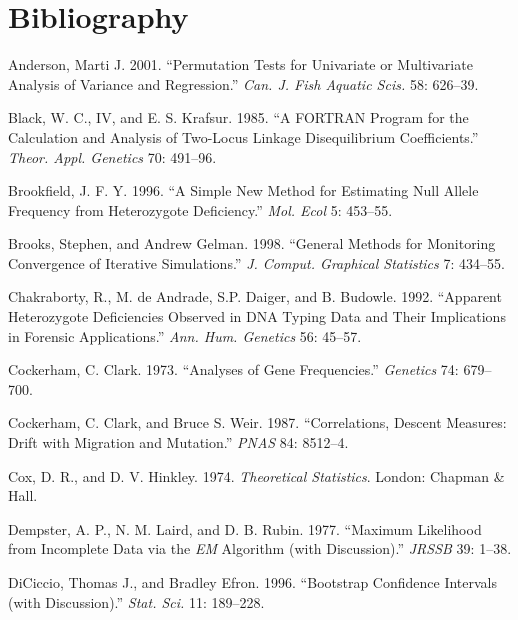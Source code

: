 \documentclass[12pt,]{book}
\theoremstyle{definition}
\theoremstyle{definition}
\theoremstyle{definition}
\theoremstyle{remark}
\begin{document}
\printindex

\chapter*{Bibliography}\label{bibliography}

\hypertarget{refs}{}
\hypertarget{ref-Anderson01}{}
Anderson, Marti J. 2001. ``Permutation Tests for Univariate or
Multivariate Analysis of Variance and Regression.'' \emph{Can. J. Fish
Aquatic Scis.} 58: 626--39.

\hypertarget{ref-BlackK85}{}
Black, W. C., IV, and E. S. Krafsur. 1985. ``A FORTRAN Program for the
Calculation and Analysis of Two-Locus Linkage Disequilibrium
Coefficients.'' \emph{Theor. Appl. Genetics} 70: 491--96.

\hypertarget{ref-Brookfield96}{}
Brookfield, J. F. Y. 1996. ``A Simple New Method for Estimating Null
Allele Frequency from Heterozygote Deficiency.'' \emph{Mol. Ecol} 5:
453--55.

\hypertarget{ref-BrooksG98}{}
Brooks, Stephen, and Andrew Gelman. 1998. ``General Methods for
Monitoring Convergence of Iterative Simulations.'' \emph{J. Comput.
Graphical Statistics} 7: 434--55.

\hypertarget{ref-ChakrabortyADB92}{}
Chakraborty, R., M. de Andrade, S.P. Daiger, and B. Budowle. 1992.
``Apparent Heterozygote Deficiencies Observed in DNA Typing Data and
Their Implications in Forensic Applications.'' \emph{Ann. Hum. Genetics}
56: 45--57.

\hypertarget{ref-Cockerham73}{}
Cockerham, C. Clark. 1973. ``Analyses of Gene Frequencies.''
\emph{Genetics} 74: 679--700.

\hypertarget{ref-CockerhamW87}{}
Cockerham, C. Clark, and Bruce S. Weir. 1987. ``Correlations, Descent
Measures: Drift with Migration and Mutation.'' \emph{PNAS} 84: 8512--4.

\hypertarget{ref-CoxH74}{}
Cox, D. R., and D. V. Hinkley. 1974. \emph{Theoretical Statistics}.
London: Chapman \& Hall.

\hypertarget{ref-DempsterLR77}{}
Dempster, A. P., N. M. Laird, and D. B. Rubin. 1977. ``Maximum
Likelihood from Incomplete Data via the \emph{EM} Algorithm (with
Discussion).'' \emph{JRSSB} 39: 1--38.

\hypertarget{ref-DiCiccioE96}{}
DiCiccio, Thomas J., and Bradley Efron. 1996. ``Bootstrap Confidence
Intervals (with Discussion).'' \emph{Stat. Sci.} 11: 189--228.
\end{document}
